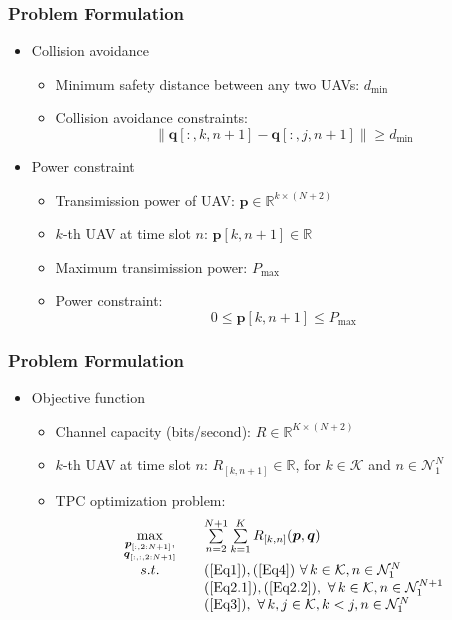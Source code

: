 \documentclass[11.5pt]{beamer}
\begin{document}
\begin{frame}
	\frametitle{Problem Formulation}
	\begin{itemize}\itemsep2em
		\item<1-> Collision avoidance
		\begin{itemize}
			\item Minimum safety distance between any two UAVs: $d_{\min}$
			\item Collision avoidance constraints:
				\begin{equation}\label{Eq3}
					\left\lVert\boldsymbol{q}[:,k,n+1]-\boldsymbol{q}[:,j,n+1]\right\rVert\geq d_{\min}
				\end{equation}
		\end{itemize}
		\item<2-> Power constraint
		\begin{itemize}
			\item Transimission power of UAV: $\boldsymbol{p}\in\mathbb{R}^{k\times (N+2)}$
			\item $k$-th UAV at time slot $n$: $\boldsymbol{p}[k,n+1]\in\mathbb{R}$
			\item Maximum transimission power: $P_{\max}$
			\item Power constraint:
				\begin{equation}\label{Eq4}
					0\leq \boldsymbol{p}[k,n+1]\leq P_{\max}
				\end{equation}
		\end{itemize}
	\end{itemize}
\end{frame}


\begin{frame}
	\frametitle{Problem Formulation}
	\begin{itemize}\itemsep4em
		\item<1-> Objective function 
		\begin{itemize}
			\item Channel capacity (bits/second): $R\in\mathbb{R}^{K\times (N+2)}$
			\item $k$-th UAV at time slot $n$: $R_{[k,n+1]}\in\mathbb{R}$, for $k\in\mathcal{K}$ and $n\in\mathcal{N}_1^N$
			\item TPC optimization problem: 
				\begin{equation} 
					\begin{array}{cll}
						\max\limits_{\substack{\boldsymbol{p}_{[:,2:N+1]},\\ \boldsymbol{q}_{[:,:,2:N+1]}}}\quad & 						\sum\limits_{n=2}^{N+1}\sum\limits_{k=1}^K R_{[k,n]}(\boldsymbol{p},\boldsymbol{q}) \\ 
						s.t. \quad & (\ref{Eq1}),(\ref{Eq4})\ \forall\,k\in\mathcal{K},n\in\mathcal{N}_1^N \\
						& (\ref{Eq2.1}),(\ref{Eq2.2}),\ \forall\,k\in\mathcal{K},n\in\mathcal{N}_1^{N+1} \\
						& (\ref{Eq3}),\ \forall\,k,j\in\mathcal{K},k<j,n\in\mathcal{N}_1^N
					\end{array}
				\end{equation}
		\end{itemize}
	\end{itemize}
\end{frame}
\end{document}

